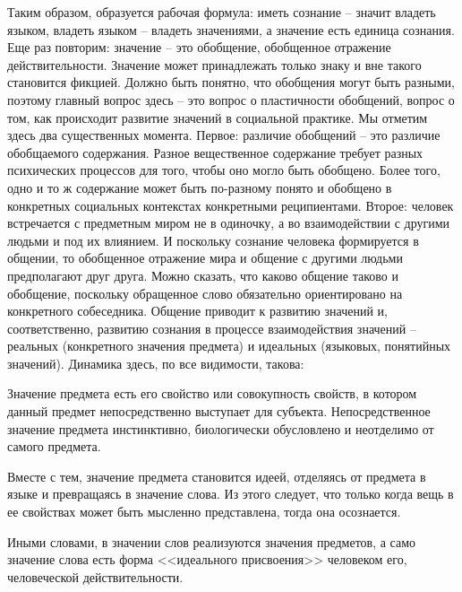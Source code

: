 Таким образом, образуется рабочая формула: иметь сознание -- значит
владеть языком, владеть языком -- владеть значениями, а значение есть
единица сознания. Еще раз повторим: значение -- это обобщение,
обобщенное отражение действительности. Значение может принадлежать
только знаку и вне такого становится фикцией. Должно быть понятно, что
обобщения могут быть разными, поэтому главный вопрос здесь -- это
вопрос о пластичности обобщений, вопрос о том, как происходит развитие
значений в социальной практике. Мы отметим здесь два существенных
момента. Первое: различие обобщений -- это различие обобщаемого
содержания. Разное вещественное содержание требует разных психических
процессов для того, чтобы оно могло быть обобщено. Более того, одно и то
ж содержание может быть по-разному понято и обобщено в конкретных
социальных контекстах конкретными реципиентами. Второе: человек
встречается с предметным миром не в одиночку, а во взаимодействии с
другими людьми и под их влиянием. И поскольку сознание человека
формируется в общении, то обобщенное отражение мира и общение с
другими людьми предполагают друг друга. Можно сказать, что каково
общение таково и обобщение, поскольку обращенное слово обязательно
ориентировано на конкретного собеседника. Общение приводит к развитию
значений и, соответственно, развитию сознания в процессе взаимодействия
значений -- реальных (конкретного значения предмета) и идеальных
(языковых, понятийных значений). Динамика здесь, по все видимости,
такова:
\begin{enumerate*}
\item Значение предмета есть его свойство или совокупность свойств, в
  котором данный предмет непосредственно выступает для субъекта.
  Непосредственное значение предмета инстинктивно, биологически
  обусловлено и неотделимо от самого предмета.
\item Вместе с тем, значение
  предмета становится идеей, отделяясь от предмета в языке и превращаясь в
  значение слова. Из этого следует, что только когда вещь в ее свойствах
  может быть мысленно представлена, тогда она осознается.
\item Иными
  словами, в значении слов реализуются значения предметов, а само значение
  слова есть форма <<идеального присвоения>> человеком его, человеческой
  действительности.
\end{enumerate*}

